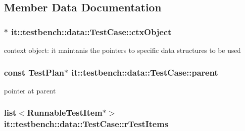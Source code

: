\subsection{Member Data Documentation}
\hypertarget{classit_1_1testbench_1_1data_1_1TestCase_af03e52147e65966b332f3374f8df9f0c}{
\subsubsection[{ctx\-Object}]{$\ast$ it\-::testbench\-::data\-::\-Test\-Case\-::ctx\-Object\hspace{0.3cm}{\ttfamily [private]}}}\label{de/d0a/classit_1_1testbench_1_1data_1_1TestCase_af03e52147e65966b332f3374f8df9f0c}
context object\-: it maintanis the pointers to specific data structures to be used \hypertarget{classit_1_1testbench_1_1data_1_1TestCase_a80afa358e2299772f9fbe5e788789280}{
\subsubsection[{parent}]{\setlength{\rightskip}{0pt plus 5cm}const {\bf Test\-Plan}$\ast$ it\-::testbench\-::data\-::\-Test\-Case\-::parent\hspace{0.3cm}{\ttfamily [private]}}}\label{de/d0a/classit_1_1testbench_1_1data_1_1TestCase_a80afa358e2299772f9fbe5e788789280}
pointer at parent \hypertarget{classit_1_1testbench_1_1data_1_1TestCase_a4d596b1e388e3955dc6007e64391e214}{
\subsubsection[{r\-Test\-Items}]{\setlength{\rightskip}{0pt plus 5cm}list$<${\bf Runnable\-Test\-Item}$\ast$$>$ it\-::testbench\-::data\-::\-Test\-Case\-::r\-Test\-Items\hspace{0.3cm}{\ttfamily [private]}}}\label{de/d0a/classit_1_1testbench_1_1data_1_1TestCase_a4d596b1e388e3955dc6007e64391e214}
